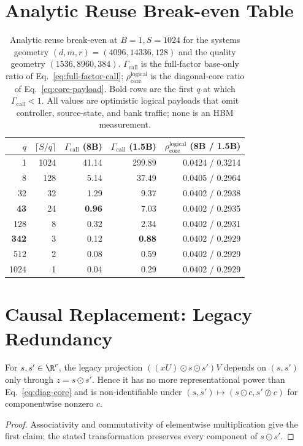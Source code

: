 \section{Analytic Reuse Break-even Table}
\label{app:regimecall}

\begin{table}[h]
\centering
\caption{Analytic reuse break-even at $B{=}1,S{=}1024$ for the systems
geometry $(d,m,r)=(4096,14336,128)$ and the quality geometry
$(1536,8960,384)$.  $\Gamma_{\mathrm{call}}$ is the full-factor base-only
ratio of Eq.~\eqref{eq:full-factor-call};
$\rho_{\mathrm{core}}^{\mathrm{logical}}$ is the diagonal-core ratio of
Eq.~\eqref{eq:core-payload}.  Bold rows are the first $q$ at which
$\Gamma_{\mathrm{call}}<1$.  All values are optimistic logical payloads
that omit controller, source-state, and bank traffic; none is an HBM
measurement.}
\label{tab:regimecall}
\begin{tabular}{rrrrr}
\toprule
$q$ & $\lceil S/q\rceil$ & $\Gamma_{\mathrm{call}}$ (8B) & $\Gamma_{\mathrm{call}}$ (1.5B) & $\rho_{\mathrm{core}}^{\mathrm{logical}}$ (8B / 1.5B) \\
\midrule
1   & 1024 & 41.14 & 299.89 & 0.0424 / 0.3214 \\
8   & 128  & 5.14  & 37.49  & 0.0405 / 0.2964 \\
32  & 32   & 1.29  & 9.37   & 0.0402 / 0.2938 \\
\textbf{43}  & 24  & \textbf{0.96} & 7.03   & 0.0402 / 0.2935 \\
128 & 8    & 0.32  & 2.34   & 0.0402 / 0.2931 \\
\textbf{342} & 3   & 0.12  & \textbf{0.88} & 0.0402 / 0.2929 \\
512 & 2    & 0.08  & 0.59   & 0.0402 / 0.2929 \\
1024& 1    & 0.04  & 0.29   & 0.0402 / 0.2929 \\
\bottomrule
\end{tabular}
\end{table}

\section{Causal Replacement: Legacy Redundancy}
\label{app:causal}

\begin{proposition}
For $s,s'\in\R^r$, the legacy projection
$((xU)\odot s\odot s')V$ depends on $(s,s')$ only through
$z=s\odot s'$.  Hence it has no more representational power than
Eq.~\eqref{eq:diag-core} and is non-identifiable under
$(s,s')\mapsto(s\odot c,s'\oslash c)$ for componentwise nonzero $c$.
\end{proposition}
\begin{proof}
Associativity and commutativity of elementwise multiplication give the first
claim; the stated transformation preserves every component of $s\odot s'$.
\end{proof}

